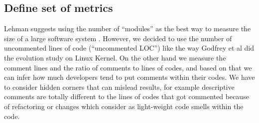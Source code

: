 \begin{table}\label{tab:eval_java}\centering
	\caption{Proposed experiment projects with preliminary results of most recent version of release in our dataset}
	\begin{threeparttable}
	\end{threeparttable}
\end{table}

\subsection{Define set of metrics}

Lehman suggests using the number of “modules” as the best way to measure the size of a large software system \cite{Lehman1997METRICS}. However, we decided to use the number of uncommented lines of code (“uncommented LOC”) like the way Godfrey et al \cite{Godfrey2000ICMS} did the evolution study on Linux Kernel. On the other hand we measure the comment lines and the ratio of comments to lines of codes, and based on that we can infer how much developers tend to put comments within their codes. We have to consider hidden corners that can mislead results, for example descriptive comments are totally different to the lines of codes that got commented because of refactoring or changes which consider as light-weight code smells within the code.

